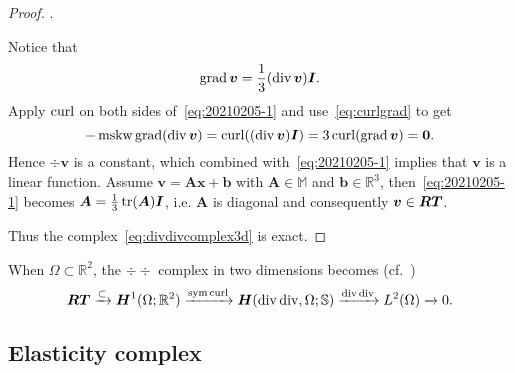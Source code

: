 \begin{proof}
\medskip
{}. 

Notice that
\begin{equation}\label{eq:20210205-1}
\operatorname{grad}\boldsymbol v =\frac{1}{3}(\operatorname{div}\boldsymbol v)\boldsymbol I.
\end{equation}
Apply $\operatorname{curl}$ on both sides of~\eqref{eq:20210205-1} and use~\eqref{eq:curlgrad} to get
$$
-\operatorname{mskw}\operatorname{grad}(\operatorname{div}\boldsymbol v)=\operatorname{curl}((\operatorname{div}\boldsymbol v)\boldsymbol I)=3\operatorname{curl}(\operatorname{grad}\boldsymbol v)=\boldsymbol0.
$$
Hence $\div\boldsymbol v$ is a constant, which combined with~\eqref{eq:20210205-1} implies that $\boldsymbol v$ is a linear function. Assume $\boldsymbol v=\boldsymbol A\boldsymbol x+\boldsymbol b$ with $\boldsymbol A\in\mathbb M$ and $\boldsymbol b\in\mathbb R^3$, then~\eqref{eq:20210205-1} becomes $\boldsymbol A=\frac{1}{3}\operatorname*{tr}(\boldsymbol A)\boldsymbol I$, i.e. $\boldsymbol A$ is diagonal and consequently $\boldsymbol v\in\boldsymbol{RT}$.

Thus the complex~\eqref{eq:divdivcomplex3d} is exact.
\end{proof}

When $\Omega\subset\mathbb R^2$,
the $\div\div$ complex in two dimensions becomes (cf.~\cite{ChenHuang2018})
\begin{equation*}%
\boldsymbol {RT}\xrightarrow{\subset} \boldsymbol H^1(\Omega;\mathbb R^2)\xrightarrow{\sym\curl} \boldsymbol{H}(\div\div,\Omega; \mathbb{S}) \xrightarrow{\div {\div}} L^2(\Omega)\xrightarrow{}0.
\end{equation*}



\subsection{Elasticity complex}

